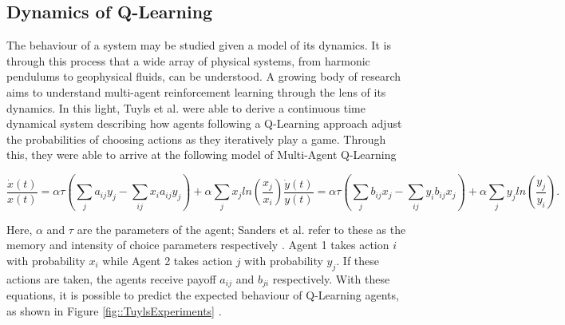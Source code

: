 \documentclass[letterpaper]{article} %
\begin{document}
\subsection{Dynamics of Q-Learning}

The behaviour of a system may be studied given a model of its
    dynamics. It is through this process that a wide array of physical
    systems, from harmonic pendulums to geophysical fluids, can be
    understood. A growing body of research aims to understand
    multi-agent reinforcement learning through the lens of its
    dynamics. In this light, Tuyls et al. \cite{Tuyls2006AnGames} were able to derive a continuous time dynamical
system describing how agents following a Q-Learning approach adjust the probabilities of choosing actions
as they iteratively play a game.  Through this, they were able to
    arrive at the following model of Multi-Agent Q-Learning

    \begin{subequations}
    \label{eqn::EOM}
        \begin{equation}
            \frac{\dot{x}(t)}{x(t)} = \alpha \tau (\sum_{j} a_{ij} y_j - \sum_{i j} x_i a_{ij} y_j)
            + \alpha \sum_j x_j ln(\frac{x_j}{x_i}) 
        \end{equation}
        \begin{equation}
            \frac{\dot{y}(t)}{y(t)} = \alpha \tau (\sum_{j} b_{ij} x_j - \sum_{i j} y_i b_{ij} x_j)
            + \alpha \sum_j y_j ln(\frac{y_j}{y_i}).
        \end{equation}
    \end{subequations}

    Here, $\alpha$ and $\tau$ are the parameters of the agent; Sanders et al. refer to these as the
    memory and intensity of choice parameters respectively . Agent 1 takes action $i$ with probability
    $x_i$ while Agent 2 takes action $j$ with probability $y_j$. If these actions are taken, the agents
    receive payoff $a_{ij}$ and $b_{ji}$ respectively. With these equations, it is possible to
    predict the expected behaviour of Q-Learning agents, as shown in Figure 
    \ref{fig::TuylsExperiments} .
\end{document}
